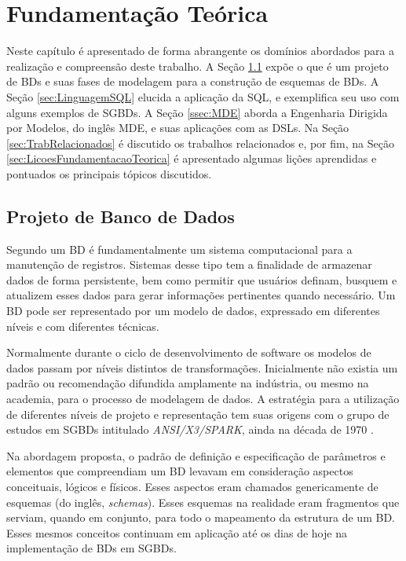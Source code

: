 \chapter{Fundamentação Teórica}\label{fundamentacaoTeorica}

Neste capítulo é apresentado de forma abrangente os domínios abordados para a realização e compreensão deste trabalho. 
A Seção \ref{sec:ProjetoBD} expõe o que é um projeto de \acp{BD} e suas fases de modelagem para a construção de esquemas de \acp{BD}. 
A Seção \ref{sec:LinguagemSQL} elucida a aplicação da \ac{SQL}, e exemplifica seu uso com alguns exemplos de \acp{SGBD}. 
A Seção \ref{ssec:MDE} aborda a Engenharia Dirigida por Modelos, do inglês \ac{MDE}, e suas aplicações com as \acp{DSL}. 
Na Seção \ref{sec:TrabRelacionados} é discutido os trabalhos relacionados e, por fim, na Seção \ref{sec:LicoesFundamentacaoTeorica} é apresentado algumas lições aprendidas e pontuados os principais tópicos discutidos.

\section{Projeto de Banco de Dados} \label{sec:ProjetoBD}

Segundo  um \ac{BD} é fundamentalmente um sistema computacional para a manutenção de registros. 
Sistemas desse tipo tem a finalidade de armazenar dados de forma persistente, bem como permitir que usuários definam, busquem e atualizem esses dados para gerar informações pertinentes quando necessário. 
Um \ac{BD} pode ser representado por um modelo de dados, expressado em diferentes níveis e com diferentes técnicas.

Normalmente durante o ciclo de desenvolvimento de software os modelos de dados passam por níveis distintos de transformações. 
Inicialmente não existia um padrão ou recomendação difundida amplamente na indústria, ou mesmo na academia, para o processo de modelagem de dados. 
A estratégia para a utilização de diferentes níveis de projeto e representação tem suas origens com o grupo de estudos em \acp{SGBD} intitulado \textit{ANSI/X3/SPARK}, ainda na década de 1970 \cite{DBLP:1975}.  

Na abordagem proposta, o padrão de definição e especificação de parâmetros e elementos que compreendiam um \ac{BD} levavam em consideração aspectos conceituais, lógicos e físicos. 
Esses aspectos eram chamados genericamente de esquemas (do inglês, \textit{schemas}). 
Esses esquemas na realidade eram fragmentos que serviam, quando em conjunto, para todo o mapeamento da estrutura de um \ac{BD}. 
Esses mesmos conceitos continuam em aplicação até os dias de hoje na implementação de \acp{BD} em \acp{SGBD}.  


